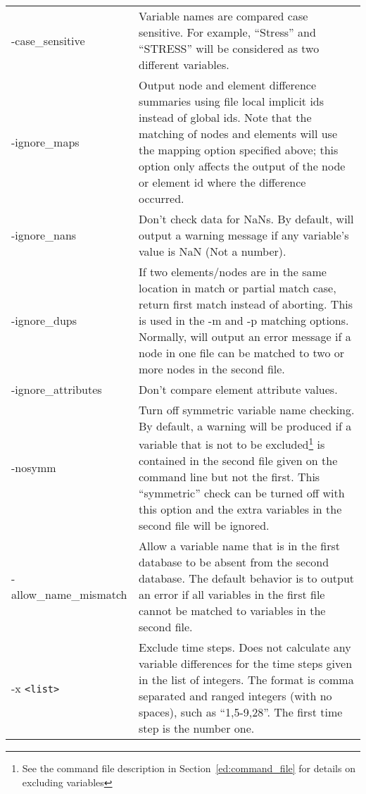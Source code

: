 \begin{longtable}{lp{4.0in}}
-case\_sensitive & Variable names are compared case sensitive. For
	example, ``Stress'' and ``STRESS'' will be considered as two different
	variables. \\

-ignore\_maps& Output node and element difference summaries using file local implicit
        ids instead of global ids. Note that the matching of
	nodes and elements will use the mapping option
	specified above; this option only affects the output of the node or
	element id where the difference occurred. \\

-ignore\_nans& Don't check data for NaNs.  By default, \exodiff{} will
	output a warning message if any variable's value is NaN (Not a number). \\

-ignore\_dups& If two elements/nodes are in the same location in match or partial
	match case, return first match instead of
	aborting. This is used in the -m and -p matching options.  Normally,
	\exodiff{} will output an error message if a node in one file can be
	matched to two or more nodes in the second file.\\

-ignore\_attributes& Don't compare element attribute values. \\

-nosymm & Turn off symmetric variable name checking.  By default, a warning
	will be produced if a variable that is not to be excluded\footnote{See
	the command file description in Section~\ref{ed:command_file} for
	details on excluding variables} is contained in the second file given
	on the command line but not the first.  This ``symmetric'' check can be
	turned off with this option and the extra variables in the second file
	will be ignored.\\

-allow\_name\_mismatch  & Allow a variable name that is in the first database to
	be absent from the second database.  The default behavior is to
	output an error if all variables in the first file cannot be matched
	to variables in the second file.\\

-x {\tt <list>} & Exclude time steps.  Does not calculate any
	variable differences for the time steps
	given in the list of integers.  The format is comma
	separated and ranged integers (with no spaces), such as ``1,5-9,28''.
	The first time step is the number one. \\


\end{longtable}
